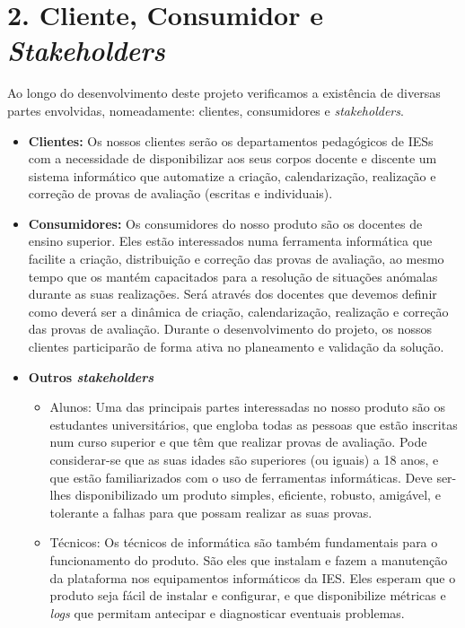\chapter*{2. Cliente, Consumidor e \textit{Stakeholders}}

{\TextoCor

Ao longo do desenvolvimento deste projeto verificamos a existência de diversas partes envolvidas, nomeadamente: clientes, consumidores e \textit{stakeholders}.

\begin{itemize}
\item \textbf{Clientes:} Os nossos clientes serão os departamentos pedagógicos de IESs com a necessidade de disponibilizar aos seus corpos docente e discente um sistema informático que automatize a criação, calendarização, realização e correção de provas de avaliação (escritas e individuais).

\item \textbf{Consumidores:} Os consumidores do nosso produto são os docentes de ensino superior. Eles estão interessados numa ferramenta informática que facilite a criação, distribuição e correção das provas de avaliação, ao mesmo tempo que os mantém capacitados para a resolução de situações anómalas durante as suas realizações. Será através dos docentes que devemos definir como deverá ser a dinâmica de criação, calendarização, realização e correção das provas de avaliação. Durante o desenvolvimento do projeto, os nossos clientes participarão de forma ativa no planeamento e validação da solução.

\item \textbf{Outros \textit{stakeholders}} 
    \begin{itemize}
        \item Alunos: Uma das principais partes interessadas no nosso produto são os estudantes universitários, que engloba todas as pessoas que estão inscritas num curso superior e que têm que realizar provas de avaliação. Pode considerar-se que as suas idades são superiores (ou iguais) a 18 anos, e que estão familiarizados com o uso de ferramentas informáticas. Deve ser-lhes disponibilizado um produto simples, eficiente, robusto, amigável, e tolerante a falhas para que possam realizar as suas provas.
        
        \item Técnicos: Os técnicos de informática são também fundamentais para o funcionamento do produto. São eles que instalam e fazem a manutenção da plataforma nos equipamentos informáticos da IES. Eles esperam que o produto seja fácil de instalar e configurar, e que disponibilize métricas e \textit{logs} que permitam antecipar e diagnosticar eventuais problemas.
    \end{itemize}
\end{itemize}

}